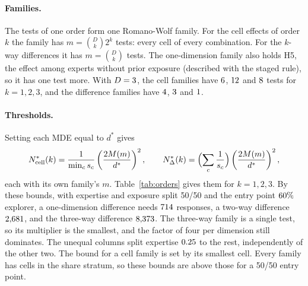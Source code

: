 \documentclass[11pt]{article}
\begin{document}
\paragraph{Families.} The tests of one order form one Romano-Wolf family. For the cell effects of order
$k$ the family has $m = \binom{D}{k} 2^k$ tests: every cell of every combination. For the $k$-way
differences it has $m = \binom{D}{k}$ tests. The one-dimension family also holds H5, the effect
among experts without prior exposure (described with the staged rule), so it has one test more. With $D = \NDims$, the cell families have
$6$, $12$ and $8$ tests for $k = 1, 2, 3$, and the difference
families have $4$, $3$ and $1$.

\paragraph{Thresholds.} Setting each MDE equal to $d^{*}$ gives
\begin{equation}
  N^{*}_{\text{cell}}(k) = \frac{1}{\min_c s_c}\left(\frac{2M(m)}{d^{*}}\right)^{2}, \qquad
  N^{*}_{\Delta}(k) = \Bigl(\sum_{c} \frac{1}{s_c}\Bigr)\left(\frac{2M(m)}{d^{*}}\right)^{2},
  \label{eq:nstar-het}
\end{equation}
each with its own family's $m$. Table~\ref{tab:orders} gives them for $k = 1, 2, 3$. By these
bounds, with expertise and exposure split 50/50 and the entry point $\PExpl$ explorer, a
one-dimension difference needs $714$ responses, a two-way difference
$2{,}681$, and the three-way difference $8{,}373$. The three-way family is a single test, so its
multiplier is the smallest, and the factor of four per dimension still dominates. The unequal
columns split expertise $\PUneq$ to the rest, independently of the other two. The bound for a cell
family is set by its smallest cell. Every family has cells in the share stratum, so these bounds
are above those for a 50/50 entry point.

\begin{table}[!htbp]
  \centering
  \footnotesize
  \setlength{\tabcolsep}{4pt}
  
  \caption{Responses needed, $N^{*}$, for heterogeneity analyses of order $k$ with $D = \NDims$
  candidate dimensions, from equation~\eqref{eq:nstar-het}. $m$ is the number of tests in the
  order's family and $M = M(m)$, with the Bonferroni critical value, so the entries are upper
  bounds. Table~\ref{tab:n} gives the Romano-Wolf thresholds. Columns 0.5 and 0.3 give $d^{*}$
  with expertise and exposure split 50/50 and the entry point $\PExpl$ explorer. The unequal columns
  use $d^{*} = 0.5$ with expertise split $\PUneq$ to the rest.}
  \label{tab:orders}
\end{table}
\end{document}
